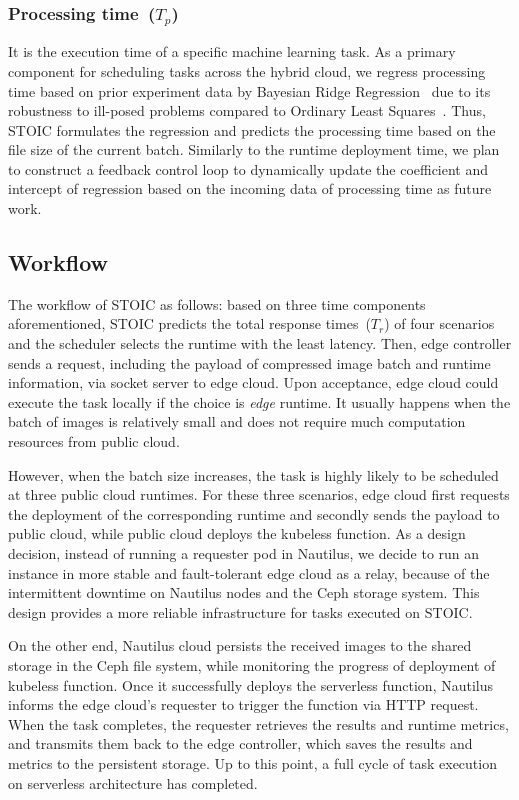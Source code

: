  \subsubsection{Processing time~($T_p$)} It is the execution time of a specific machine learning task. As a primary component for scheduling tasks across the hybrid cloud, we regress processing time based on prior experiment data by Bayesian Ridge Regression~\cite{ref:brr} due to its robustness to ill-posed problems compared to Ordinary Least Squares~\cite{ref:ols}. Thus, STOIC formulates the regression and predicts the processing time based on the file size of the current batch. Similarly to the runtime deployment time, we plan to construct a feedback control loop to dynamically update the coefficient and intercept of regression based on the incoming data of processing time as future work.
 
 \subsection{Workflow}
 The workflow of STOIC as follows: based on three time components aforementioned, STOIC predicts the total response times~($T_r$) of four scenarios and the scheduler selects the runtime with the least latency. Then, edge controller sends a request, including the payload of compressed image batch and runtime information, via socket server to edge cloud. Upon acceptance, edge cloud could execute the task locally if the choice is \textit{edge} runtime. It usually happens when the batch of images is relatively small and does not require much computation resources from public cloud.
 
 However, when the batch size increases, the task is highly likely to be scheduled at three public cloud runtimes. For these three scenarios, edge cloud first requests the deployment of the corresponding runtime and secondly sends the payload to public cloud, while public cloud deploys the kubeless function. As a design decision, instead of running a requester pod in Nautilus, we decide to run an instance in more stable and fault-tolerant edge cloud as a relay, because of the intermittent downtime on Nautilus nodes and the Ceph storage system. This design provides a more reliable infrastructure for tasks executed on STOIC.
 
 On the other end, Nautilus cloud persists the received images to the shared storage in the Ceph file system, while monitoring the progress of deployment of kubeless function. Once it successfully deploys the serverless function, Nautilus informs the edge cloud's requester to trigger the function via HTTP request. When the task completes, the requester retrieves the results and runtime metrics, and transmits them back to the edge controller, which saves the results and metrics to the persistent storage. Up to this point, a full cycle of task execution on serverless architecture has completed.
 
